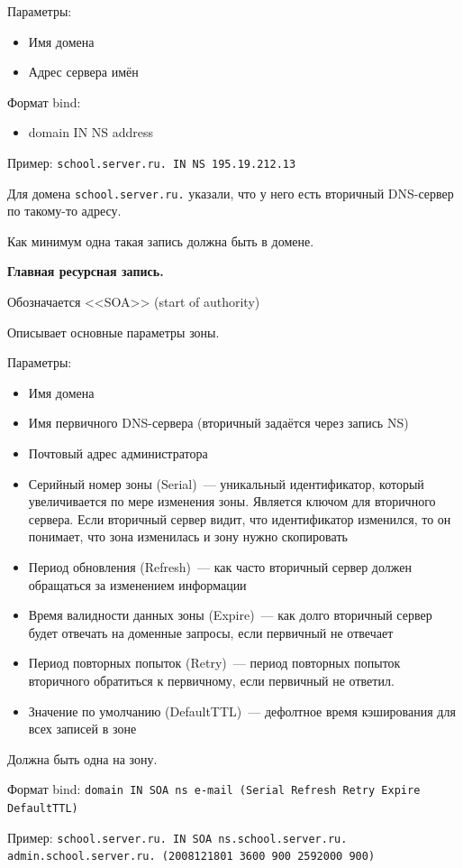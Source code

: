 Параметры:
\begin{itemize}
    \item Имя домена
    \item Адрес сервера имён
\end{itemize}
Формат bind:
\begin{itemize}
    \item domain IN NS address
\end{itemize}
Пример: {\tt school.server.ru. IN NS 195.19.212.13}

Для домена {\tt school.server.ru.} указали, что у него есть вторичный DNS-сервер по такому-то адресу.

Как минимум одна такая запись должна быть в домене.

 {\bf Главная ресурсная запись.}

 Обозначается <<SOA>> (start of authority)

 Описывает основные параметры зоны.

 Параметры:
 \begin{itemize}
    \item Имя домена
    \item Имя первичного DNS-сервера (вторичный задаётся через запись NS)
    \item Почтовый адрес администратора
    \item Серийный номер зоны (Serial)~--- уникальный идентификатор, который увеличивается по мере изменения зоны. Является ключом для вторичного сервера. Если вторичный сервер видит, что идентификатор изменился, то он понимает, что зона изменилась и зону нужно скопировать 
    \item Период обновления (Refresh)~--- как часто вторичный сервер должен обращаться за изменением информации
    \item Время валидности данных зоны (Expire)~--- как долго вторичный сервер будет отвечать на доменные запросы, если первичный не отвечает
    \item Период повторных попыток (Retry)~--- период повторных попыток вторичного обратиться к первичному, если первичный не ответил.
    \item Значение по умолчанию (DefaultTTL)~--- дефолтное время кэширования для всех записей в зоне
\end{itemize}

Должна быть одна на зону.

Формат bind: {\tt domain IN SOA ns e-mail (Serial Refresh Retry Expire DefaultTTL)}

Пример: {\tt school.server.ru. IN SOA ns.school.server.ru. admin.school.server.ru. (2008121801 3600 900 2592000 900)}

